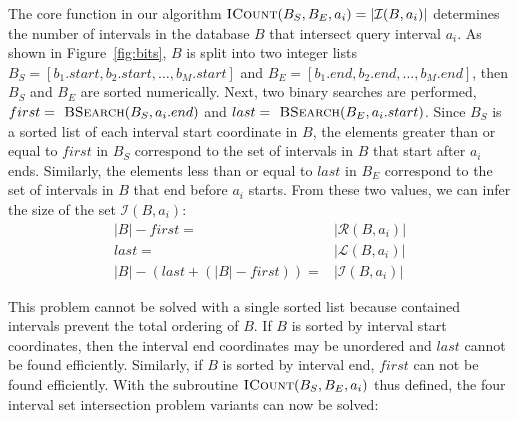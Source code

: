 \documentclass{bioinfo}
\begin{document}
	The core function in our algorithm 
	$\textsc{ICount}(B_S,B_E,a_i) = |\mathcal{I}(B,a_i)|$ determines the number of
	intervals in the database $B$ that intersect query interval $a_i$.  As shown in
	Figure~\ref{fig:bits}, $B$ is split into two integer lists 
	$B_S = [b_1.start, b_2.start, \dots, b_M.start]$ and 
	$B_E = [b_1.end, b_2.end, \dots, b_M.end]$, then $B_S$ and $B_E$ are sorted
	numerically.  Next, two binary searches are performed,
	$first=\textsc{ BSearch}(B_S, a_i.end)$ and 
	$last=\textsc{ BSearch}(B_E,
	a_i.start)$.  Since $B_S$ is a sorted list of each interval start coordinate in
	$B$, the elements greater than or equal to $first$ in $B_S$ correspond to the
	set of intervals in $B$ that start after $a_i$ ends.  Similarly, the elements
	less than or equal to $last$ in $B_E$ correspond to the set of intervals in $B$
	that end before $a_i$ starts.  From these two values, we can infer the size of
	the set $\mathcal{I}(B,a_i)$:
	\begin{equation*}
		\begin{split}
			|B|-first=&|\mathcal{R}(B,a_i)| \\
			last=&|\mathcal{L}(B,a_i)| \\ 
			|B|-(last+(|B|-first))=&|\mathcal{I}(B,a_i)|
		\end{split}
	\end{equation*}

	This problem cannot be solved with a single sorted list because
	contained intervals prevent the total ordering of $B$. If $B$ is
	sorted by interval start coordinates, then the interval end
	coordinates may be unordered and $last$ cannot be found
	efficiently.  Similarly, if $B$ is sorted by interval end,
	$first$ can not be found efficiently.  With the subroutine
	$\textsc{ICount}(B_S,B_E,a_i)$ thus defined, the four interval set intersection
	problem variants can now be solved:
\end{document}
